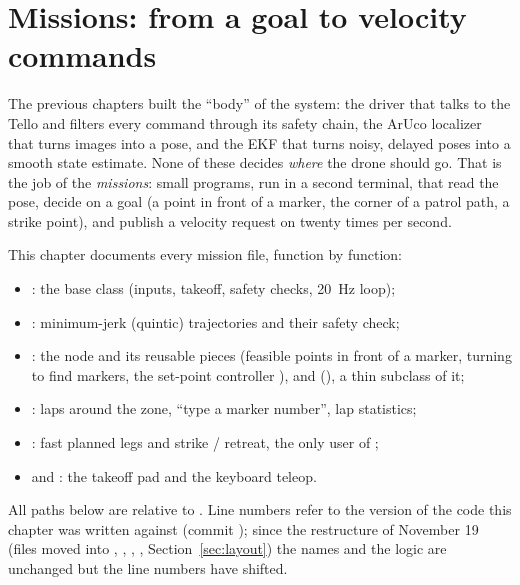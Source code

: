 \chapter{Missions: from a goal to velocity commands}
\label{ch:missions}
\sloppy %

The previous chapters built the ``body'' of the system: the driver that talks to the Tello and filters every
command through its safety chain, the ArUco localizer that turns images into a pose, and the EKF that turns noisy,
delayed poses into a smooth state estimate. None of these decides \emph{where} the drone should go. That is the job
of the \emph{missions}: small programs, run in a second terminal, that read the pose, decide on a goal (a point in
front of a marker, the corner of a patrol path, a strike point), and publish a velocity request on
 twenty times per second.

This chapter documents every mission file, function by function:

\begin{itemize}[nosep]
  \item {}: the  base class (inputs, takeoff, safety checks, 20~Hz loop);
  \item {}: minimum-jerk (quintic) trajectories and their safety check;
  \item {}: the  node and its reusable pieces (feasible points in front of a
        marker, turning to find markers, the set-point controller ), and 
        (), a thin subclass of it;
  \item {}: laps around the zone, ``type a marker number'', lap statistics;
  \item {}: fast planned legs and strike / retreat, the only user of ;
  \item {} and : the takeoff pad and the keyboard teleop.
\end{itemize}

All paths below are relative to . Line numbers refer to the version of the
code this chapter was written against (commit ); since the restructure of November 19 (files moved
into , , , , Section~\ref{sec:layout}) the names
and the logic are unchanged but the line numbers have shifted.

